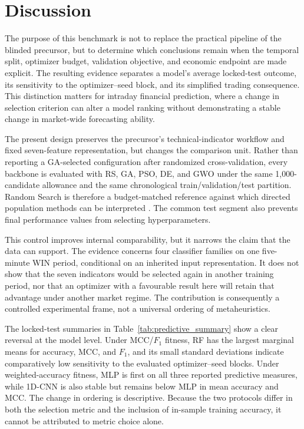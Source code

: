 \section{Discussion}\label{sec:discussion}

The purpose of this benchmark is not to replace the practical pipeline of the blinded precursor, but to determine which conclusions remain when the temporal split, optimizer budget, validation objective, and economic endpoint are made explicit. The resulting evidence separates a model's average locked-test outcome, its sensitivity to the optimizer--seed block, and its simplified trading consequence. This distinction matters for intraday financial prediction, where a change in selection criterion can alter a model ranking without demonstrating a stable change in market-wide forecasting ability.

The present design preserves the precursor's technical-indicator workflow and fixed seven-feature representation, but changes the comparison unit. Rather than reporting a GA-selected configuration after randomized cross-validation, every backbone is evaluated with RS, GA, PSO, DE, and GWO under the same 1,000-candidate allowance and the same chronological train/validation/test partition. Random Search is therefore a budget-matched reference against which directed population methods can be interpreted \cite{bergstra2012random_search}. The common test segment also prevents final performance values from selecting hyperparameters.

This control improves internal comparability, but it narrows the claim that the data can support. The evidence concerns four classifier families on one five-minute WIN period, conditional on an inherited input representation. It does not show that the seven indicators would be selected again in another training period, nor that an optimizer with a favourable result here will retain that advantage under another market regime. The contribution is consequently a controlled experimental frame, not a universal ordering of metaheuristics.


The locked-test summaries in Table~\ref{tab:predictive_summary} show a clear reversal at the model level. Under MCC/$F_1$ fitness, RF has the largest marginal means for accuracy, MCC, and $F_1$, and its small standard deviations indicate comparatively low sensitivity to the evaluated optimizer--seed blocks. Under weighted-accuracy fitness, MLP is first on all three reported predictive measures, while 1D-CNN is also stable but remains below MLP in mean accuracy and MCC. The change in ordering is descriptive. Because the two protocols differ in both the selection metric and the inclusion of in-sample training accuracy, it cannot be attributed to metric choice alone.

